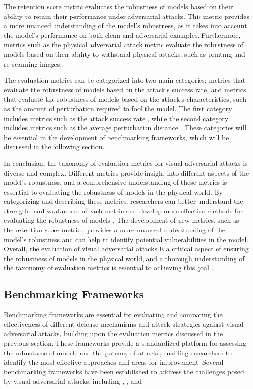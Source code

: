 \documentclass[11pt]{article}
\begin{document}
The retention score metric \cite{ref170} evaluates the robustness of models based on their ability to retain their performance under adversarial attacks. This metric provides a more nuanced understanding of the model's robustness, as it takes into account the model's performance on both clean and adversarial examples. Furthermore, metrics such as the physical adversarial attack metric \cite{ref142} evaluate the robustness of models based on their ability to withstand physical attacks, such as printing and re-scanning images.

The evaluation metrics can be categorized into two main categories: metrics that evaluate the robustness of models based on the attack's success rate, and metrics that evaluate the robustness of models based on the attack's characteristics, such as the amount of perturbation required to fool the model. The first category includes metrics such as the attack success rate \cite{ref95}, while the second category includes metrics such as the average perturbation distance \cite{ref167}. These categories will be essential in the development of benchmarking frameworks, which will be discussed in the following section.

In conclusion, the taxonomy of evaluation metrics for visual adversarial attacks is diverse and complex. Different metrics provide insight into different aspects of the model's robustness, and a comprehensive understanding of these metrics is essential to evaluating the robustness of models in the physical world. By categorizing and describing these metrics, researchers can better understand the strengths and weaknesses of each metric and develop more effective methods for evaluating the robustness of models \cite{ref164}. The development of new metrics, such as the retention score metric \cite{ref170}, provides a more nuanced understanding of the model's robustness and can help to identify potential vulnerabilities in the model. Overall, the evaluation of visual adversarial attacks is a critical aspect of ensuring the robustness of models in the physical world, and a thorough understanding of the taxonomy of evaluation metrics is essential to achieving this goal \cite{ref7}.

\subsection{Benchmarking Frameworks}

Benchmarking frameworks are essential for evaluating and comparing the effectiveness of different defense mechanisms and attack strategies against visual adversarial attacks, building upon the evaluation metrics discussed in the previous section. These frameworks provide a standardized platform for assessing the robustness of models and the potency of attacks, enabling researchers to identify the most effective approaches and areas for improvement. Several benchmarking frameworks have been established to address the challenges posed by visual adversarial attacks, including \cite{ref171}, \cite{ref172}, and \cite{ref173}.
\end{document}
